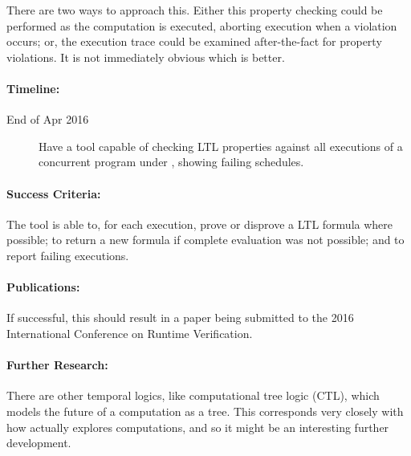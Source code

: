 There are two ways to approach this. Either this property checking
could be performed as the computation is executed, aborting execution
when a violation occurs; or, the execution trace could be examined
after-the-fact for property violations. It is not immediately obvious
which is better.

\paragraph{Timeline:}

\begin{description}
\item[End of Apr 2016] Have a tool capable of checking LTL properties
  against all executions of a concurrent program under \dejafu{},
  showing failing schedules.
\end{description}

\paragraph{Success Criteria:}

The tool is able to, for each execution, prove or disprove a LTL
formula where possible; to return a new formula if complete evaluation
was not possible; and to report failing executions.

\paragraph{Publications:}

If successful, this should result in a paper being submitted to the
2016 International Conference on Runtime Verification.

\paragraph{Further Research:}

There are other temporal logics, like computational tree logic (CTL),
which models the future of a computation as a tree. This corresponds
very closely with how \dejafu{} actually explores computations, and so
it might be an interesting further development.
